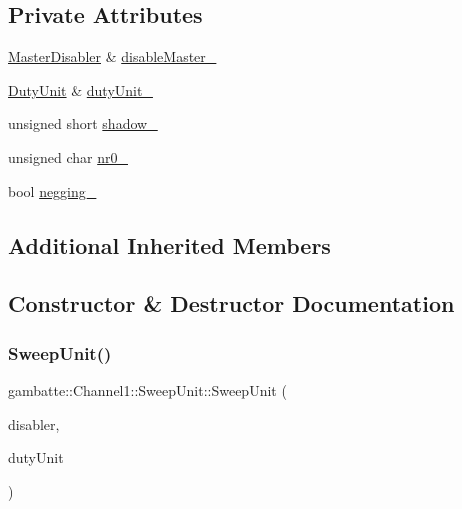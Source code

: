 \subsection*{Private Attributes}
\begin{DoxyCompactItemize}
\item 
\hyperlink{classgambatte_1_1MasterDisabler}{Master\+Disabler} \& \hyperlink{classgambatte_1_1Channel1_1_1SweepUnit_a6ccec31d73ac308e0801d2c95a3970d8}{disable\+Master\+\_\+}
\item 
\hyperlink{classgambatte_1_1DutyUnit}{Duty\+Unit} \& \hyperlink{classgambatte_1_1Channel1_1_1SweepUnit_a267cbe2007d0b13e7659a82f40c24544}{duty\+Unit\+\_\+}
\item 
unsigned short \hyperlink{classgambatte_1_1Channel1_1_1SweepUnit_af1861651dc7a6a7dde893a1df498771d}{shadow\+\_\+}
\item 
unsigned char \hyperlink{classgambatte_1_1Channel1_1_1SweepUnit_ab7e9cf92f0d9efca5a51774dbc37a985}{nr0\+\_\+}
\item 
bool \hyperlink{classgambatte_1_1Channel1_1_1SweepUnit_a288f0ab06ac66c247ca17002e230ae1e}{negging\+\_\+}
\end{DoxyCompactItemize}
\subsection*{Additional Inherited Members}


\subsection{Constructor \& Destructor Documentation}
\mbox{\label{classgambatte_1_1Channel1_1_1SweepUnit_a1b12e2135d03fe19b7b20d5f7884c2d8}} 
\subsubsection{\texorpdfstring{Sweep\+Unit()}{SweepUnit()}}
{\footnotesize\ttfamily gambatte\+::\+Channel1\+::\+Sweep\+Unit\+::\+Sweep\+Unit (\begin{DoxyParamCaption}\item[{\hyperlink{classgambatte_1_1MasterDisabler}{Master\+Disabler} \&}]{disabler,  }\item[{\hyperlink{classgambatte_1_1DutyUnit}{Duty\+Unit} \&}]{duty\+Unit }\end{DoxyParamCaption})}



